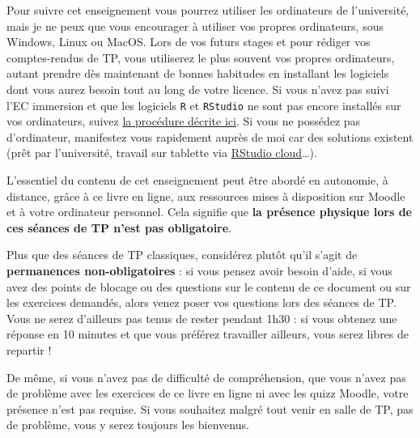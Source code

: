 \documentclass[
  a4paper,
  DIV=11,
  numbers=noendperiod,
  oneside]{scrreprt}
\begin{document}
Pour suivre cet enseignement vous pourrez utiliser les ordinateurs de
l'université, mais je ne peux que vous encourager à utiliser vos propres
ordinateurs, sous Windows, Linux ou MacOS. Lors de vos futurs stages et
pour rédiger vos comptes-rendus de TP, vous utiliserez le plus souvent
vos propres ordinateurs, autant prendre dès maintenant de bonnes
habitudes en installant les logiciels dont vous aurez besoin tout au
long de votre licence. Si vous n'avez pas suivi l'EC immersion et que
les logiciels \texttt{R} et \texttt{RStudio} ne sont pas encore
installés sur vos ordinateurs, suivez
\href{https://besibo.github.io/BiometrieS3/01-R-basics.html\#sec-install}{la
procédure décrite ici}. Si vous ne possédez pas d'ordinateur, manifestez
vous rapidement auprès de moi car des solutions existent (prêt par
l'université, travail sur tablette via
\href{https://rstudio.cloud}{RStudio cloud}\ldots).

\begin{tcolorbox}[enhanced jigsaw, colbacktitle=quarto-callout-important-color!10!white, opacityback=0, titlerule=0mm, leftrule=.75mm, bottomtitle=1mm, colframe=quarto-callout-important-color-frame, title=\textcolor{quarto-callout-important-color}{\faExclamation}\hspace{0.5em}{Important}, bottomrule=.15mm, opacitybacktitle=0.6, colback=white, rightrule=.15mm, breakable, toptitle=1mm, arc=.35mm, toprule=.15mm, left=2mm, coltitle=black]
L'essentiel du contenu de cet enseignement peut être abordé en
autonomie, à distance, grâce à ce livre en ligne, aux ressources mises à
disposition sur Moodle et à votre ordinateur personnel. Cela signifie
que \textbf{la présence physique lors de ces séances de TP n'est pas
obligatoire}.
\end{tcolorbox}

Plus que des séances de TP classiques, considérez plutôt qu'il s'agit de
\textbf{permanences non-obligatoires} : si vous pensez avoir besoin
d'aide, si vous avez des points de blocage ou des questions sur le
contenu de ce document ou sur les exercices demandés, alors venez poser
vos questions lors des séances de TP. Vous ne serez d'ailleurs pas tenus
de rester pendant 1h30 : si vous obtenez une réponse en 10 minutes et
que vous préférez travailler ailleurs, vous serez libres de repartir !

De même, si vous n'avez pas de difficulté de compréhension, que vous
n'avez pas de problème avec les exercices de ce livre en ligne ni avec
les quizz Moodle, votre présence n'est pas requise. Si vous souhaitez
malgré tout venir en salle de TP, pas de problème, vous y serez toujours
les bienvenus.
\end{document}
